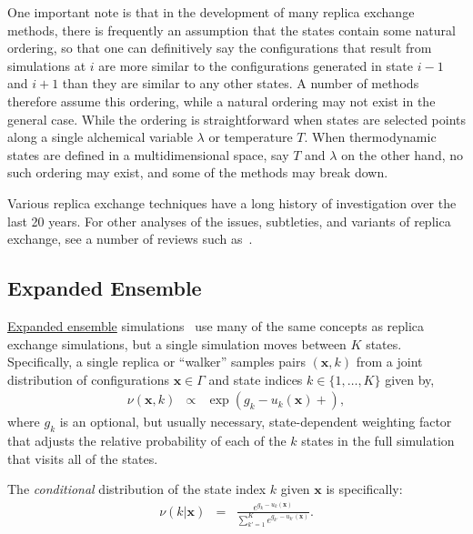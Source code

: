 \documentclass[9pt,review]{livecoms}
\newcommand{\vx}{\mathbf{x}}
\begin{document}
One important note is that in the development of many replica exchange methods, there is frequently an assumption that the states contain some natural ordering, so that one can definitively say the configurations that result from simulations at $i$ are more similar to the configurations generated in state $i-1$ and $i+1$ than they are similar to any other states.  A number of methods therefore assume this ordering, while a natural ordering may not exist in the general case.  While the ordering is straightforward when states are selected points along a single alchemical variable $\lambda$ or temperature $T$. When thermodynamic states are defined in a multidimensional space, say $T$ and $\lambda$ on the other hand, no such ordering may exist, and some of the methods may break down.

Various replica exchange techniques have a long history of investigation over the last 20 years. For other analyses of the issues, subtleties, and variants of replica exchange, see a number of reviews such as~\cite{Abrams:E:2014,Gallicchio:CPC:2015,Itoh:JCTC:2013,kofke:2002:jcp:acceptance-probability,Liu:CPL:2018,nadler-hansmann:pre:2007:optimized-replica-exchange-moves,Qi:PSMaP:2018,shenfeld-xu:pre:2009:thermodynamic-length,sindhikara-emerson-roitberg:jctc:2010:exchange-often-and-properly}.

\subsection{Expanded Ensemble}
\hyperlink{ref:ExpEns} {Expanded ensemble} simulations~\cite{lyubartsev:jcp:1992:expanded-ensembles} use many of the same concepts as replica exchange simulations, but a single simulation moves between $K$ states. Specifically, a single replica or ``walker'' samples pairs $(\vx,k)$ from a joint distribution of configurations $\vx \in \Gamma$ and state indices $k \in \{1,\ldots,K\}$ given by,
\begin{eqnarray}
\nu(\vx,k) &\propto& \exp(g_k-u_k(\vx) + ) ,
\end{eqnarray}
where $g_k$ is an optional, but usually necessary, state-dependent weighting factor that adjusts the relative probability of each of the $k$ states in the full simulation that visits all of the states.

The \emph{conditional} distribution of the state index $k$ given $\vx$ is specifically:
\begin{eqnarray}
\nu(k | \vx) &=& \frac{e^{g_k - u_k(\vx)}}{\sum\limits_{k'=1}^K e^{g_{k'} - u_{k'}(\vx)}}.
\end{eqnarray}
\end{document}
